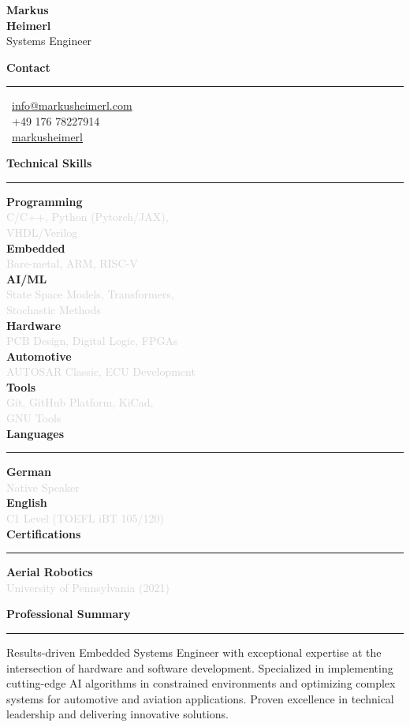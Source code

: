 \documentclass[a4paper,10pt]{article}
\newcommand{\cvsection}[1]{
    \vspace{12pt}
    {\large\bfseries\color{darkgray} #1}
    \vspace{4pt}
    \hrule
    \vspace{8pt}
}
\newcommand{\cvitem}[2]{
    \textbf{\color{darkgray}#1} \\
    \textcolor{lightgray}{\small #2} \\[5pt]
}
\begin{document}
\setlength{\columnsep}{0.8cm}
\begin{paracol}{2}


\vspace{0.5cm}

\begin{center}
    {\LARGE\bfseries\color{darkgray} Markus} \\[4pt]
    {\LARGE\bfseries\color{primaryblue} Heimerl} \\[8pt]
    {\small\color{darkgray} Systems Engineer}
\end{center}

\vspace{0.6cm}

\cvsection{Contact}
\small
\faEnvelope\, \href{mailto:info@markusheimerl.com}{info@markusheimerl.com} \\[5pt]
\faPhone\, +49 176 78227914 \\[5pt]
\faGithub\, \href{https://github.com/markusheimerl}{markusheimerl}

\cvsection{Technical Skills}
\cvitem{Programming}{C/C++, Python (Pytorch/JAX),\\ VHDL/Verilog}
\cvitem{Embedded}{Bare-metal, ARM, RISC-V}
\cvitem{AI/ML}{State Space Models, Transformers, \\ Stochastic Methods}
\cvitem{Hardware}{PCB Design, Digital Logic, FPGAs}
\cvitem{Automotive}{AUTOSAR Classic, ECU Development}
\cvitem{Tools}{Git, GitHub Platform, KiCad,\\ GNU Tools}

\cvsection{Languages}
\cvitem{German}{Native Speaker}
\cvitem{English}{C1 Level (TOEFL iBT 105/120)}

\cvsection{Certifications}
\textbf{Aerial Robotics} \\
\textcolor{lightgray}{\small University of Pennsylvania (2021)}

\vspace{0.5cm}

\switchcolumn

\vspace{0.5cm}

\cvsection{Professional Summary}
Results-driven Embedded Systems Engineer with exceptional expertise at the intersection of hardware and software development. Specialized in implementing cutting-edge AI algorithms in constrained environments and optimizing complex systems for automotive and aviation applications. Proven excellence in technical leadership and delivering innovative solutions.


\end{paracol}
\end{document}
